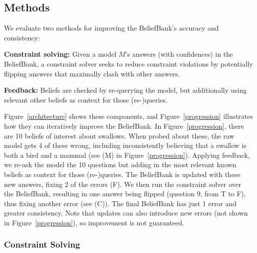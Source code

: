 \documentclass[11pt]{article}
\newenvironment{des}{                 %
     \parskip 0cm \begin{list}{}{\parsep 0cm \itemsep 0cm \topsep 0cm}}{
       \end{list}} %
\begin{document}
\subsection{Methods}

We evaluate two methods for improving the BeliefBank's accuracy and consistency:
\begin{des}
\item[{\bf Constraint solving:}] Given a model $M$'s answers (with confidences) in the BeliefBank, a constraint
solver seeks to reduce constraint violations by potentially flipping answers that maximally clash
with other answers. 
\item[{\bf Feedback:}] Beliefs are checked by re-querying the model, but additionally
using relevant other beliefs as context for those (re-)queries. 
\end{des}
\vspace{1mm}
Figure~\ref{architecture} shows these components, and 
Figure~\ref{progression} illustrates how they can iteratively improve the BeliefBank.
In Figure~\ref{progression}, there are 10 beliefs of interest about swallows. When probed about these, the raw model 
gets 4 of these wrong, including inconsistently believing that a swallow is both a bird and a mammal
(see (M) in Figure~\ref{progression}). Applying feedback, we re-ask the model the 10 questions but adding 
in the most relevant known beliefs as context for those (re-)queries. The BeliefBank is updated with
these new answers, fixing 2 of the errors (F). We then run the constraint solver over the BeliefBank,
resulting in one answer being flipped (question 9, from T to F), thus fixing another error (see (C)). 
The final BeliefBank has just 1 error and greater consistency.  
Note that updates can also 
introduce new errors (not shown in Figure~\ref{progression}), so improvement is not guaranteed. 

\subsubsection{Constraint Solving \label{constraint-solving}}
\end{document}
